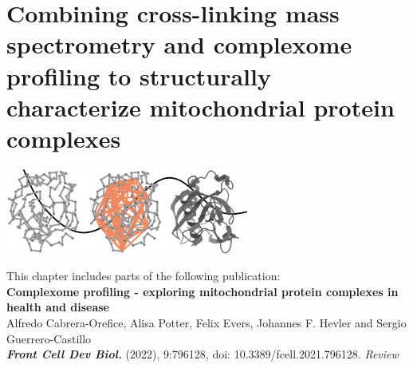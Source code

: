 \chapter{Combining cross-linking mass spectrometry and complexome profiling to structurally characterize mitochondrial protein complexes} \label{ch-1}

{
\begin{center}    
\footnotesize
\includegraphics[width=0.6\textwidth]{Chapter.1/Figures/chapter1_cover.png}
\end{center} 
}

\begin{flushleft}
This chapter includes parts of the following publication:\\
\textbf{Complexome profiling - exploring mitochondrial protein complexes in health and disease}\\
\footnotesize
\vspace{0.3cm}
Alfredo Cabrera-Orefice, Alisa Potter, Felix Evers, Johannes F. Hevler and Sergio Guerrero-Castillo \\
\vspace{0.3cm}
\textbf{\emph{Front Cell Dev Biol.}} (2022), 9:796128, doi: 10.3389/fcell.2021.796128. \emph{Review}\\
\end{flushleft}
\newpage

